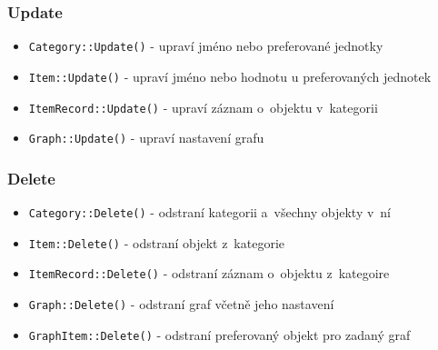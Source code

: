 \documentclass[12pt, titlepage]{article}
\begin{document}
	\subsubsection{Update}
\begin{itemize}
	\item \texttt{Category::Update()} - upraví jméno nebo preferované jednotky
	\item \texttt{Item::Update()} - upraví jméno nebo hodnotu u preferovaných jednotek
	\item \texttt{ItemRecord::Update()} - upraví záznam o~objektu v~kategorii
	\item \texttt{Graph::Update()} - upraví nastavení grafu
\end{itemize}

	\subsubsection{Delete}
\begin{itemize}
	\item \texttt{Category::Delete()} - odstraní kategorii a~všechny objekty v~ní
	\item \texttt{Item::Delete()} - odstraní objekt z~kategorie
	\item \texttt{ItemRecord::Delete()} - odstraní záznam o~objektu z~kategoire
	\item \texttt{Graph::Delete()} - odstraní graf včetně jeho nastavení
	\item \texttt{GraphItem::Delete()} - odstraní preferovaný objekt pro zadaný  graf
\end{itemize}
\end{document}
